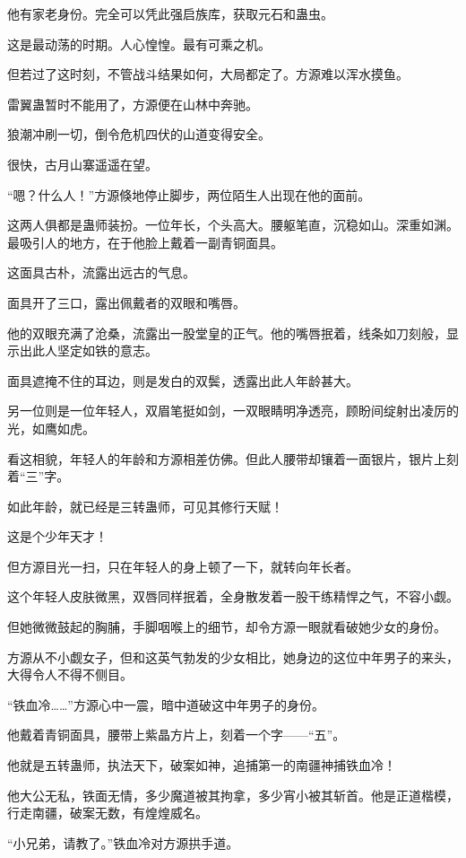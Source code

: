 \begin{this_body}
他有家老身份。完全可以凭此强启族库，获取元石和蛊虫。

这是最动荡的时期。人心惶惶。最有可乘之机。

但若过了这时刻，不管战斗结果如何，大局都定了。方源难以浑水摸鱼。

雷翼蛊暂时不能用了，方源便在山林中奔驰。

狼潮冲刷一切，倒令危机四伏的山道变得安全。

很快，古月山寨遥遥在望。

“嗯？什么人！”方源倏地停止脚步，两位陌生人出现在他的面前。

这两人俱都是蛊师装扮。一位年长，个头高大。腰躯笔直，沉稳如山。深重如渊。最吸引人的地方，在于他脸上戴着一副青铜面具。

这面具古朴，流露出远古的气息。

面具开了三口，露出佩戴者的双眼和嘴唇。

他的双眼充满了沧桑，流露出一股堂皇的正气。他的嘴唇抿着，线条如刀刻般，显示出此人坚定如铁的意志。

面具遮掩不住的耳边，则是发白的双鬓，透露出此人年龄甚大。

另一位则是一位年轻人，双眉笔挺如剑，一双眼睛明净透亮，顾盼间绽射出凌厉的光，如鹰如虎。

看这相貌，年轻人的年龄和方源相差仿佛。但此人腰带却镶着一面银片，银片上刻着“三”字。

如此年龄，就已经是三转蛊师，可见其修行天赋！

这是个少年天才！

但方源目光一扫，只在年轻人的身上顿了一下，就转向年长者。

这个年轻人皮肤微黑，双唇同样抿着，全身散发着一股干练精悍之气，不容小觑。

但她微微鼓起的胸脯，手脚咽喉上的细节，却令方源一眼就看破她少女的身份。

方源从不小觑女子，但和这英气勃发的少女相比，她身边的这位中年男子的来头，大得令人不得不侧目。

“铁血冷……”方源心中一震，暗中道破这中年男子的身份。

他戴着青铜面具，腰带上紫晶方片上，刻着一个字——“五”。

他就是五转蛊师，执法天下，破案如神，追捕第一的南疆神捕铁血冷！

他大公无私，铁面无情，多少魔道被其拘拿，多少宵小被其斩首。他是正道楷模，行走南疆，破案无数，有煌煌威名。

“小兄弟，请教了。”铁血冷对方源拱手道。


\end{this_body}
